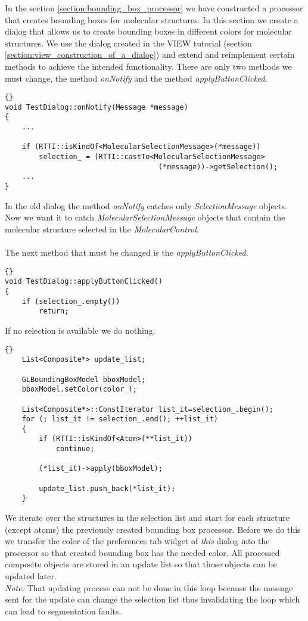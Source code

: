 In the section \ref{section:bounding_box_processor} we have constructed a processor that creates bounding boxes
for molecular structures. In this section we create a dialog that allows us to
create bounding boxes in different colors for molecular structures. We use the dialog
created in the VIEW tutorial (section \ref{section:view_construction_of_a_dialog}) and extend and 
reimplement certain methods to achieve the intended functionality.
There are only two methods we must change, the method {\em onNotify} and the method
{\em applyButtonClicked}.

\begin{lstlisting}{}
void TestDialog::onNotify(Message *message)
{
	...

	if (RTTI::isKindOf<MolecularSelectionMessage>(*message))
		selection_ = (RTTI::castTo<MolecularSelectionMessage>
									(*message))->getSelection();
	...
}
\end{lstlisting}

In the old dialog the method {\em onNotify} catches only {\em SelectionMessage} objects.
Now we want it to catch {\em MolecularSelectionMessage} objects that contain the 
molecular structure selected in the {\em MolecularControl}.\\ \\
The next method that must be changed is the {\em applyButtonClicked}.

\begin{lstlisting}{}
void TestDialog::applyButtonClicked()
{
	if (selection_.empty())
		return;
\end{lstlisting}

If no selection is available we do nothing.

\begin{lstlisting}{}
	List<Composite*> update_list;

	GLBoundingBoxModel bboxModel;
	bboxModel.setColor(color_);

	List<Composite*>::ConstIterator list_it=selection_.begin();
	for (; list_it != selection_.end(); ++list_it)
	{
		if (RTTI::isKindOf<Atom>(**list_it))
			continue;
		
		(*list_it)->apply(bboxModel);
		
		update_list.push_back(*list_it);
	}
\end{lstlisting}

We iterate over the structures in the selection list and start for each
structure (except atoms) the previously created bounding box processor. Before we
do this we transfer the color of the preferences tab widget of {\em *this} dialog
into the processor so that created bounding box has the needed color.
All processed composite objects are stored in an update list so that those objects
can be updated later. \\
{\em Note: } That updating process can not be done in this loop because
the message sent for the update can change the selection list thus invalidating
the loop which can lead to segmentation faults. 
	
